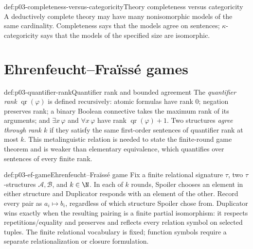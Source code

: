 \begin{hbwarning}{def:p03-completeness-versus-categoricity}{Theory completeness versus categoricity}
A deductively complete theory may have many nonisomorphic models of the same
cardinality.  Completeness says that the models agree on sentences;
\(\kappa\)-categoricity says that the models of the specified size are
isomorphic.
\end{hbwarning}


\section{Ehrenfeucht--Fra\"iss\'e games}
\label{sec:p03-ef-games}

\begin{hbdefinition}{def:p03-quantifier-rank}{Quantifier rank and bounded agreement}
The \emph{quantifier rank} \(\operatorname{qr}(\varphi)\) is defined
recursively: atomic formulas have rank \(0\); negation preserves rank; a
binary Boolean connective takes the maximum rank of its arguments; and
\(\exists x\,\varphi\) and \(\forall x\,\varphi\) have rank
\(\operatorname{qr}(\varphi)+1\).  Two structures \emph{agree through rank
\(k\)} if they satisfy the same first-order sentences of quantifier rank at
most \(k\).  This metalinguistic relation is needed to state the finite-round
game theorem and is weaker than elementary equivalence, which quantifies over
sentences of every finite rank.
\end{hbdefinition}

\begin{hbdefinition}{def:p03-ef-game}{Ehrenfeucht--Fra\"iss\'e game}
Fix a finite relational signature \(\tau\), two \(\tau\)-structures
\(\mathcal A,\mathcal B\), and \(k\in\N\).  In each of \(k\) rounds,
Spoiler chooses an element in either structure and Duplicator responds with an
element of the other.  Record every pair as \(a_i\mapsto b_i\), regardless of
which structure Spoiler chose from.  Duplicator wins exactly when the resulting
pairing is a finite partial isomorphism: it respects repetitions/equality and
preserves and reflects every relation symbol on selected tuples.  The finite
relational vocabulary is fixed; function symbols require a separate
relationalization or closure formulation.
\end{hbdefinition}

